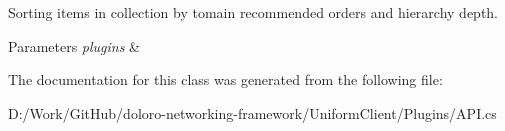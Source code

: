 Sorting items in collection by tomain recommended orders and hierarchy depth. 


\begin{DoxyParams}{Parameters}
{\em plugins} & \\
\hline
\end{DoxyParams}


The documentation for this class was generated from the following file\+:\begin{DoxyCompactItemize}
\item 
D\+:/\+Work/\+Git\+Hub/doloro-\/networking-\/framework/\+Uniform\+Client/\+Plugins/A\+P\+I.\+cs\end{DoxyCompactItemize}
